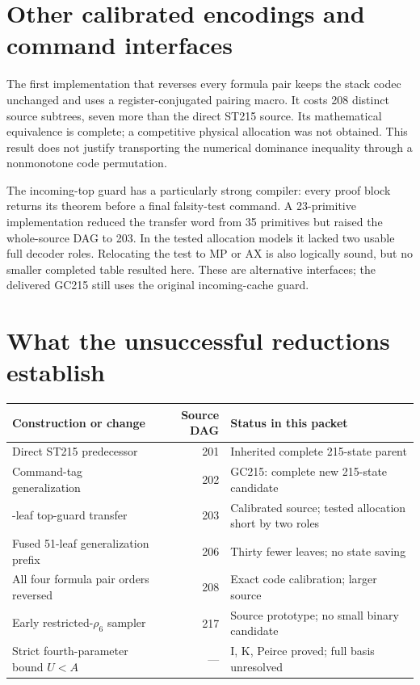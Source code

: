 \documentclass[10pt,a4paper]{article}
\begin{document}
\section{Other calibrated encodings and command interfaces}



The first implementation that reverses every formula pair keeps the stack
codec unchanged and uses a register-conjugated pairing macro.  It costs
208 distinct source subtrees, seven more than the direct ST215 source.  Its
mathematical equivalence is complete; a competitive physical allocation was
not obtained.  This result does not justify transporting the numerical
dominance inequality through a nonmonotone code permutation.



The incoming-top guard has a particularly strong compiler: every proof block
returns its theorem before a final falsity-test command.  A 23-primitive
implementation reduced the transfer word from 35 primitives but raised the
whole-source DAG to 203.  In the tested allocation models it lacked two
usable full decoder roles.  Relocating the test to MP or AX is also logically
sound, but no smaller completed table resulted here.  These are alternative
interfaces; the delivered GC215 still uses the original incoming-cache guard.

\section{What the unsuccessful reductions establish}

\begin{center}
\small
\begin{tabular}{@{}>{\raggedright\arraybackslash}p{48mm}r>{\raggedright\arraybackslash}p{65mm}@{}}
\toprule
Construction or change & Source DAG & Status in this packet\\
\midrule
Direct ST215 predecessor & 201 & Inherited complete 215-state parent\\
Command-tag generalization & 202 & GC215: complete new 215-state candidate\\
23-leaf top-guard transfer & 203 & Calibrated source; tested allocation short by two roles\\
Fused 51-leaf generalization prefix & 206 & Thirty fewer leaves; no state saving\\
All four formula pair orders reversed & 208 & Exact code calibration; larger source\\
Early restricted-$\rho_6$ sampler & 217 & Source prototype; no small binary candidate\\
Strict fourth-parameter bound $U<A$ & --- & I, K, Peirce proved; full basis unresolved\\
\bottomrule
\end{tabular}
\end{center}
\end{document}
